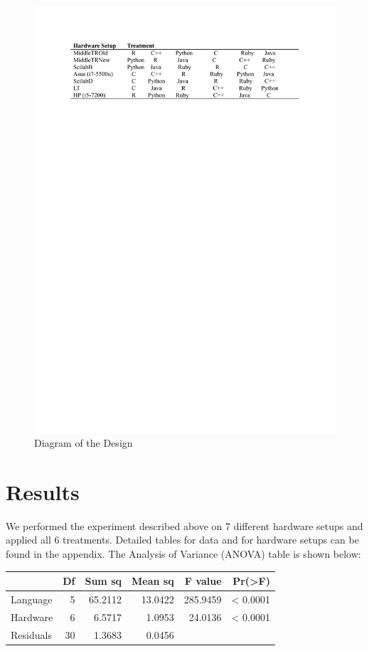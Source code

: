 \documentclass[12pt,halfline,a4paper,]{ouparticle}
\begin{document}
\begin{figure}[H]
\includegraphics[width=1\linewidth]{diagram} \caption{Diagram of the Design}\label{fig:unnamed-chunk-1}
\end{figure}

\newpage

\hypertarget{results}{%
\section{Results}\label{results}}

We performed the experiment described above on 7 different hardware
setups and applied all 6 treatments. Detailed tables for data and for
hardware setups can be found in the appendix. The Analysis of Variance
(ANOVA) table is shown below:

\begin{longtable}[]{@{}lrrrrr@{}}
\toprule\noalign{}
& Df & Sum sq & Mean sq & F value & Pr(\textgreater F) \\
\midrule\noalign{}
\endhead
\bottomrule\noalign{}
\endlastfoot
Language & 5 & 65.2112 & 13.0422 & 285.9459 & \textless{} 0.0001 \\
Hardware & 6 & 6.5717 & 1.0953 & 24.0136 & \textless{} 0.0001 \\
Residuals & 30 & 1.3683 & 0.0456 & & \\
\end{longtable}
\end{document}
